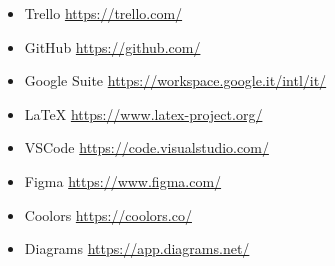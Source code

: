 \documentclass{report}
\begin{document}
\begin{itemize}
	\item Trello \qquad \url{https://trello.com/}
	\item GitHub \qquad \url{https://github.com/}
	\item Google Suite \qquad \url{https://workspace.google.it/intl/it/}
	\item LaTeX \qquad \url{https://www.latex-project.org/}
	\item VSCode \qquad \url{https://code.visualstudio.com/}
	\item Figma \qquad \url{https://www.figma.com/}
	\item Coolors \qquad \url{https://coolors.co/}
	\item Diagrams \qquad \url{https://app.diagrams.net/}
\end{itemize}
\end{document}
